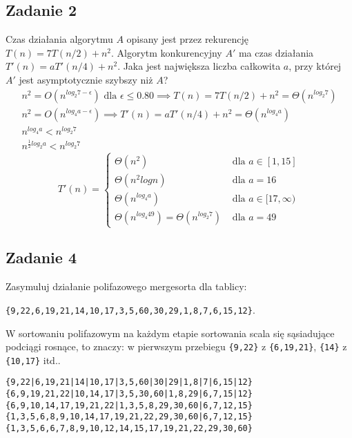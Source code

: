 \documentclass{article}
\begin{document}
\subsection*{Zadanie 2}
Czas działania algorytmu $A$ opisany jest przez rekurencję $T(n) = 7T(n/2) + n^2$.
Algorytm konkurencyjny $A'$ ma czas działania $T '(n) = aT'(n/4) + n^2$. Jaka jest największa
liczba całkowita $a$, przy której $A'$ jest asymptotycznie szybszy niż $A$?
\begin{gather*}
    n^2 = O\left(n^{log_2 7-\epsilon}\right) \text{ dla } \epsilon \leq 0.80 \implies T(n) = 7T(n/2) + n^2 = \Theta\left(n^{log_2 7}\right) \\
    n^2 = O\left(n^{log_4 a-\epsilon}\right) \implies T'(n) = aT'(n/4) + n^2 = \Theta\left(n^{log_4 a}\right) \\
    n^{log_4a} < n^{log_2 7} \\
    n^{\frac{1}{2}log_2a} < n^{log_2 7}
\end{gather*}
\begin{equation*}
    T'(n) = \begin{cases}
        \Theta\left(n^2\right)                                           & \text{ dla } a \in [1, 15]      \\
        \Theta\left(n^2logn\right)                                       & \text{ dla } a = 16             \\
        \Theta\left(n^{log_4 a}\right)                                   & \text{ dla } a \in [17, \infty) \\
        \Theta\left(n^{log_4 49}\right) = \Theta\left(n^{log_2 7}\right) & \text{ dla } a = 49
    \end{cases}
\end{equation*}

\subsection*{Zadanie 4}
Zasymuluj działanie polifazowego mergesorta dla tablicy:
\begin{center}
    \verb|{9,22,6,19,21,14,10,17,3,5,60,30,29,1,8,7,6,15,12}|.
\end{center}
W sortowaniu polifazowym na każdym etapie sortowania scala się sąsiadujące podciągi rosnące, to znaczy:
w pierwszym przebiegu \verb|{9,22}| z \verb|{6,19,21}|, \verb|{14}| z \verb|{10,17}| itd..
\begin{center}
    \verb+{9,22|6,19,21|14|10,17|3,5,60|30|29|1,8|7|6,15|12}+ \\
    \verb+{6,9,19,21,22|10,14,17|3,5,30,60|1,8,29|6,7,15|12}+ \\
    \verb+{6,9,10,14,17,19,21,22|1,3,5,8,29,30,60|6,7,12,15}+ \\
    \verb+{1,3,5,6,8,9,10,14,17,19,21,22,29,30,60|6,7,12,15}+ \\
    \verb+{1,3,5,6,6,7,8,9,10,12,14,15,17,19,21,22,29,30,60}+
\end{center}
\end{document}
